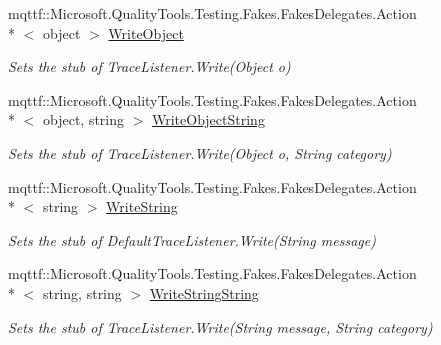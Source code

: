 \begin{DoxyCompactItemize}
mqttf\-::\-Microsoft.\-Quality\-Tools.\-Testing.\-Fakes.\-Fakes\-Delegates.\-Action\\*
$<$ object $>$ \hyperlink{class_system_1_1_diagnostics_1_1_fakes_1_1_stub_default_trace_listener_ac0dda9be0d94429b1a5d2890c7f714e5}{Write\-Object}
\begin{DoxyCompactList}\small\item\em Sets the stub of Trace\-Listener.\-Write(\-Object o)\end{DoxyCompactList}\item 
mqttf\-::\-Microsoft.\-Quality\-Tools.\-Testing.\-Fakes.\-Fakes\-Delegates.\-Action\\*
$<$ object, string $>$ \hyperlink{class_system_1_1_diagnostics_1_1_fakes_1_1_stub_default_trace_listener_a4e1de07c085cd8244759b698ba271fd7}{Write\-Object\-String}
\begin{DoxyCompactList}\small\item\em Sets the stub of Trace\-Listener.\-Write(\-Object o, String category)\end{DoxyCompactList}\item 
mqttf\-::\-Microsoft.\-Quality\-Tools.\-Testing.\-Fakes.\-Fakes\-Delegates.\-Action\\*
$<$ string $>$ \hyperlink{class_system_1_1_diagnostics_1_1_fakes_1_1_stub_default_trace_listener_a1859641f827e559b29b2983b29d1408b}{Write\-String}
\begin{DoxyCompactList}\small\item\em Sets the stub of Default\-Trace\-Listener.\-Write(\-String message)\end{DoxyCompactList}\item 
mqttf\-::\-Microsoft.\-Quality\-Tools.\-Testing.\-Fakes.\-Fakes\-Delegates.\-Action\\*
$<$ string, string $>$ \hyperlink{class_system_1_1_diagnostics_1_1_fakes_1_1_stub_default_trace_listener_a0d54c4b65da9b4f677792fdf0a09baf7}{Write\-String\-String}
\begin{DoxyCompactList}\small\item\em Sets the stub of Trace\-Listener.\-Write(\-String message, String category)\end{DoxyCompactList}\end{DoxyCompactItemize}
